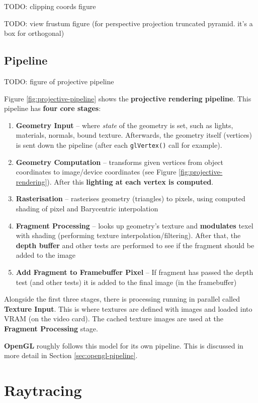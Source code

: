\documentclass{article}
\begin{document}
TODO: clipping coords figure

TODO: view frustum figure (for perspective projection truncated pyramid. it's a box for orthogonal)

\subsection{Pipeline}

TODO: figure of projective pipeline

Figure \ref{fig:projective-pipeline} shows the \textbf{projective rendering pipeline}. This pipeline has \textbf{four core stages}:
\begin{enumerate}
	\item \textbf{Geometry Input} -- where \textit{state} of the geometry is set, such as lights, materials, normals, bound texture. Afterwards, the geometry itself (vertices) is sent down the pipeline (after each \texttt{glVertex()} call for example).
	\item \textbf{Geometry Computation} -- transforms given vertices from object coordinates  to image/device coordinates (see Figure \ref{fig:projective-rendering}). After this \textbf{lighting at each vertex is computed}.
	\item \textbf{Rasterisation} -- rasterises geometry (triangles) to pixels, using computed shading of pixel and Barycentric interpolation
	\item \textbf{Fragment Processing} -- looks up geometry's texture and \textbf{modulates} texel with shading (performing texture interpolation/filtering). After that, the \textbf{depth buffer} and other tests are performed to see if the fragment should be added to the image
	\item \textbf{Add Fragment to Framebuffer Pixel} -- If fragment has passed the depth test (and other tests) it is added to the final image (in the framebuffer)
\end{enumerate}
Alongside the first three stages, there is processing running in parallel called \textbf{Texture Input}. This is where textures are defined with images and loaded into VRAM (on the video card). The cached texture images are used at the \textbf{Fragment Processing} stage. 

\textbf{OpenGL} roughly follows this model for its own pipeline. This is discussed in more detail in Section \ref{sec:opengl-pipeline}.

\section{Raytracing}
\end{document}
